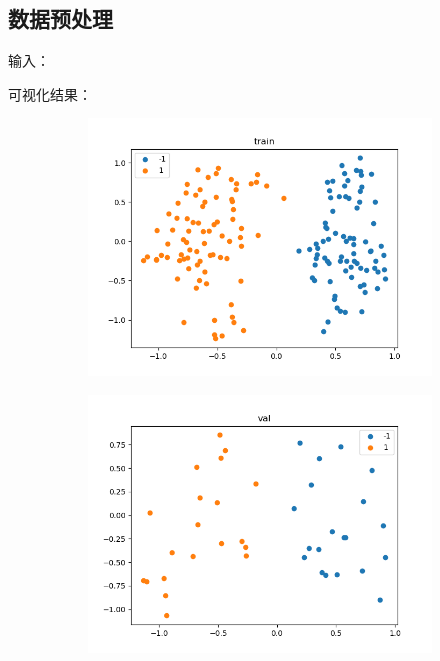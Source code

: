\documentclass[a4paper]{article}
\begin{document}
\subsection{数据预处理}
输入：

可视化结果：
\begin{figure}[H]
    \centering
        \begin{subfigure}[b]{.45\linewidth}
            \includegraphics[width=\linewidth]{../../img/pca-train.png}
        \end{subfigure}
        \begin{subfigure}[b]{.45\linewidth}
            \includegraphics[width=\linewidth]{../../img/pca-val.png}
        \end{subfigure}

\end{figure}
\end{document}
